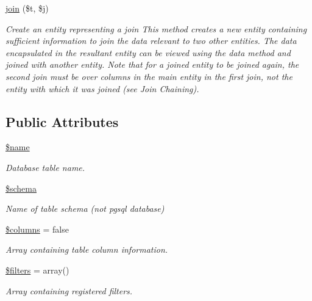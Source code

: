 \begin{DoxyCompactItemize}
\hyperlink{classentity_a4d4ed92c955fe0e4160ae7572e693be7}{join} (\$t, \$j)
\begin{DoxyCompactList}\small\item\em Create an entity representing a join This method creates a new entity containing sufficient information to join the data relevant to two other entities. The data encapsulated in the resultant entity can be viewed using the data method and joined with another entity. Note that for a joined entity to be joined again, the second join must be over columns in the main entity in the first join, not the entity with which it was joined (see Join Chaining). \end{DoxyCompactList}\end{DoxyCompactItemize}
\subsection*{Public Attributes}
\begin{DoxyCompactItemize}
\item 
\hypertarget{classentity_ae35f24992703a71e751ed6afa981380f}{}\hyperlink{classentity_ae35f24992703a71e751ed6afa981380f}{\$name}\label{classentity_ae35f24992703a71e751ed6afa981380f}

\begin{DoxyCompactList}\small\item\em Database table name. \end{DoxyCompactList}\item 
\hypertarget{classentity_a8ce4fa273c17d68fff1dd173a704b109}{}\hyperlink{classentity_a8ce4fa273c17d68fff1dd173a704b109}{\$schema}\label{classentity_a8ce4fa273c17d68fff1dd173a704b109}

\begin{DoxyCompactList}\small\item\em Name of table schema (not pgsql database) \end{DoxyCompactList}\item 
\hypertarget{classentity_a4d04649f2fb9b66924ce6a0f23633541}{}\hyperlink{classentity_a4d04649f2fb9b66924ce6a0f23633541}{\$columns} = false\label{classentity_a4d04649f2fb9b66924ce6a0f23633541}

\begin{DoxyCompactList}\small\item\em Array containing table column information. \end{DoxyCompactList}\item 
\hypertarget{classentity_a59f264aa884262d60bf96c1b750ffba8}{}\hyperlink{classentity_a59f264aa884262d60bf96c1b750ffba8}{\$filters} = array()\label{classentity_a59f264aa884262d60bf96c1b750ffba8}

\begin{DoxyCompactList}\small\item\em Array containing registered filters. \end{DoxyCompactList}\end{DoxyCompactItemize}


